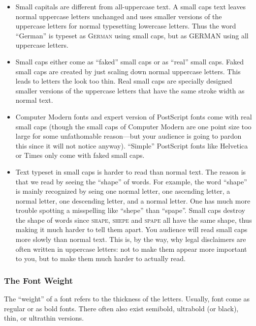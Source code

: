 \begin{itemize}
\item
  Small capitals are different from all-uppercase text. A small caps
  text leaves normal uppercase letters unchanged and uses smaller
  versions of the uppercase letters for normal typesetting lowercase
  letters. Thus the word ``German'' is typeset as \textsc{German}
  using small caps, but as \uppercase{German} using all uppercase
  letters.
\item
  Small caps either come as ``faked'' small caps or as ``real''
  small caps. Faked small caps are created by just scaling down
  normal uppercase letters. This leads to letters the look too
  thin. Real small caps are specially designed smaller versions of
  the uppercase letters that have the same stroke width as normal
  text.
\item
  Computer Modern fonts and expert version of PostScript fonts come
  with real small caps (though the small caps of Computer Modern are
  one point size too large for some unfathomable reason---but your
  audience is going to pardon this since it will not notice
  anyway). ``Simple'' PostScript fonts like Helvetica or Times only
  come with faked small caps.
\item
  Text typeset in small caps is harder to read than normal text. The
  reason is that we read by seeing the ``shape'' of words. For
  example, the word ``shape'' is mainly recognized by seing one
  normal letter, one ascending letter, a normal letter, one
  descending letter, and a normal letter. One has much more trouble
  spotting a misspelling like ``shepe''  than ``spape''. Small caps
  destroy the shape of words since \textsc{shape}, \textsc{shepe}
  and \textsc{spape} all have the same shape, thus making it much
  harder to tell them apart. You audience will read small caps more
  slowly than normal text. This is, by the way, why legal
  disclaimers are often written in uppercase letters: not to make
  them appear more important to you, but to make them much harder to
  actually read.
\end{itemize}



\subsubsection{The Font Weight}

The ``weight'' of a font refers to the thickness of the
letters. Usually, font come as regular or as bold fonts. There often
also exist semibold, ultrabold (or black), thin, or ultrathin
versions.

